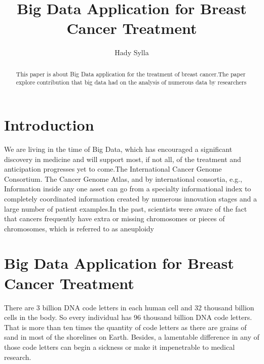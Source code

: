 \documentclass[sigconf]{acmart}
\begin{document}
\title{Big Data Application for Breast Cancer Treatment}


\author{Hady Sylla}


\renewcommand{\shortauthors}{G. v. Laszewski}


\begin{abstract}
This paper is about Big Data application for the treatment of breast cancer.The paper explore contribution that big data had on the analysis of numerous data by researchers
\end{abstract}



\maketitle

\section{Introduction}

We are living in the time of Big Data, which has encouraged a significant discovery in medicine and will support most, if not all, of the treatment and anticipation progresses yet to come\cite{murdoch2013inevitable}.The International Cancer Genome Consortium.  The Cancer Genome Atlas, and by international consortia, e.g., Information inside any one asset can go from a specialty informational index to completely coordinated information created by numerous innovation stages and a large number of patient examples\cite{murdoch2013inevitable}.In the past, scientists were aware of the fact that cancers frequently have extra or missing chromosomes or pieces of chromosomes, which is referred to as aneuploidy 

\section{Big Data Application for Breast Cancer Treatment}

\setlength{\parskip}{1em}
\renewcommand{\baselinestretch}{2.0}

There are 3 billion DNA code letters in each human cell and 32 thousand billion cells in the body. So every individual has 96 thousand billion DNA code letters\cite{cavalli1999}. That is more than ten times the quantity of code letters as there are grains of sand in most of the shorelines on Earth. Besides, a lamentable difference in any of those code letters can begin a sickness or make it impenetrable to medical research\cite{cavalli1999}.
\end{document}
